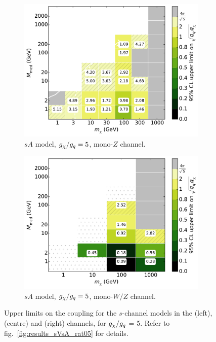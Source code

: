 \begin{figure}
\begin{subfigure}[t]{0.32\textwidth}
    \includegraphics[width=1.\textwidth]{figures/grid_allpoints_SAD_rat5.pdf}
    \caption{$sA$ model, $g_{\chi}/g_q = 5$, mono-$Z$ channel.}
  \end{subfigure}
  \begin{subfigure}[t]{0.32\textwidth}
    \centering
    \includegraphics[width=1.\textwidth]{figures/grid_basepoints_SAD_rat5_monoWZ.pdf}
    \caption{$sA$ model, $g_{\chi}/g_q = 5$, mono-$W/Z$ channel.}
  \end{subfigure}
  \caption{Upper limits on the coupling for the $s$-channel models in the \monojet (left), \monoZ (centre) and \monoWZ (right) channels, for $g_{\chi} / g_q$ = 5. Refer to fig.~\ref{fig:results_sVsA_rat05} for details.}
  \label{fig:results_sVsA_rat5}
\end{figure}

